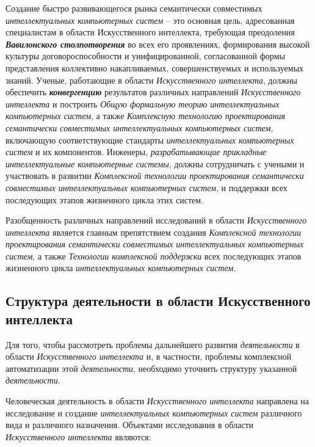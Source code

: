 Создание быстро развивающегося рынка семантически совместимых \textit{интеллектуальных компьютерных систем} -- это основная цель, адресованная специалистам в области Искусственного интеллекта, требующая преодоления \textbf{\textit{Вавилонского столпотворения}} во всех его проявлениях, формирования высокой культуры договороспособности и унифицированной, согласованной формы представления коллективно накапливаемых, совершенствуемых и используемых знаний. Ученые, работающие в области \textit{Искусственного интеллекта}, должны обеспечить \textbf{\textit{конвергенцию}} результатов различных направлений \textit{Искусственного интеллекта} и построить \textit{Общую формальную теорию интеллектуальных компьютерных систем}, а также \textit{Комплексную технологию проектирования семантически совместимых интеллектуальных компьютерных систем,} включающую соответствующие стандарты \textit{интеллектуальных компьютерных систем} и их компонентов. Инженеры, \textit{разрабатывающие прикладные интеллектуальные компьютерные системы}, должны сотрудничать с учеными и участвовать в развитии \textit{Комплексной технологии проектирования семантически совместимых интеллектуальных компьютерных систем}, и поддержки всех последующих этапов жизненного цикла этих систем.

Разобщенность различных направлений исследований в области \textit{Искусственного интеллекта} является главным препятствием создания \textit{Комплексной технологии проектирования семантически совместимых интеллектуальных компьютерных систем}, а также \textit{Технологии комплексной поддержки} всех последующих этапов жизненного цикла \textit{интеллектуальных компьютерных систем}.

\subsection{Структура деятельности в области Искусственного интеллекта}

Для того, чтобы рассмотреть проблемы дальнейшего развития \textit{деятельности} в области \textit{Искусственного интеллекта} и, в частности, проблемы комплексной автоматизации этой \textit{деятельности}, необходимо уточнить структуру указанной \textit{деятельности}.

Человеческая деятельность в области \textit{Искусственного интеллекта} направлена на исследование и создание \textit{интеллектуальных компьютерных систем} различного вида и различного назначения. Объектами исследования в области \textit{Искусственного интеллекта} являются:

